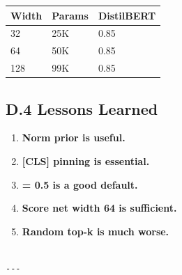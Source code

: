 \begin{table}[H]
\centering
\small
\begin{tabular}{lll}
\toprule
\textbf{Width} & \textbf{Params} & \textbf{DistilBERT} \\
\midrule
32 & 25K & 0.85 \\
64 & 50K & 0.85 \\
128 & 99K & 0.85 \\
\bottomrule
\end{tabular}
\end{table}

\subsection{D.4 Lessons Learned}

\begin{enumerate}
\item \textbf{Norm prior is useful.}
\item \textbf{[CLS] pinning is essential.}
\item \textbf{  = 0.5 is a good default.}
\item \textbf{Score net width 64 is sufficient.}
\item \textbf{Random top-k is much worse.}
\end{enumerate}
\begin{lstlisting}

---
\end{lstlisting}